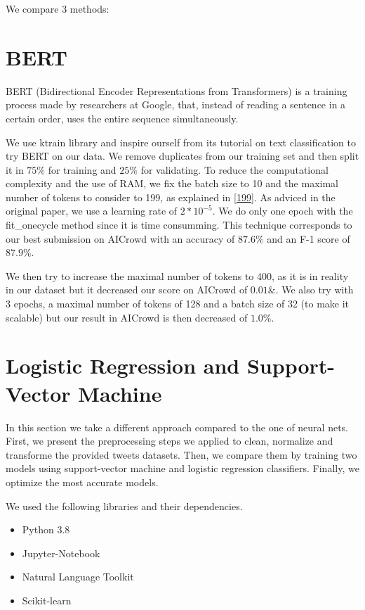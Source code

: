 \documentclass[11pt, a4paper, twocolumn]{article}
\begin{document}
We compare 3 methods:


\section{BERT}
BERT (Bidirectional Encoder Representations from Transformers)\cite{bertpaper} is a training process made by researchers at Google, that, instead of reading a sentence in a certain order, uses the entire sequence simultaneously.

We use ktrain library\cite{ktrain} and inspire ourself from its tutorial on text classification to try BERT on our data. We remove duplicates from our training set and then split it in $75\%$ for training and $25\%$ for validating. To reduce the computational complexity and the use of RAM, we fix the batch size to 10 and the maximal number of tokens to consider to 199, as explained in \ref{199}. As adviced in the original paper, we use a learning rate of $2*10^{-5}$. We do only one epoch with the fit_onecycle method since it is time consumming. This technique corresponds to our best submission on AICrowd with an accuracy of $87.6\%$ and an F-1 score of $87.9\%$.

We then try to increase the maximal number of tokens to 400, as it is in reality in our dataset but it decreased our score on AICrowd of $0.01\&$. We also try with 3 epochs, a maximal number of tokens of 128 and a batch size of 32 (to make it scalable) but our result in AICrowd is then decreased of $1.0\%$.

\section{Logistic Regression and Support-Vector Machine}
In this section we take a different approach compared to the one of neural nets. First, we present the preprocessing steps we applied to clean, normalize and transforme the provided tweets datasets. Then, we compare them by training two models using support-vector machine and logistic regression classifiers. Finally, we optimize the most accurate models.

We used the following libraries and their dependencies.
\begin{itemize}
	\setlength\itemsep{1px}
	\item Python 3.8
	\item Jupyter-Notebook
	\item Natural Language Toolkit
	\item Scikit-learn
\end{itemize}
\end{document}
